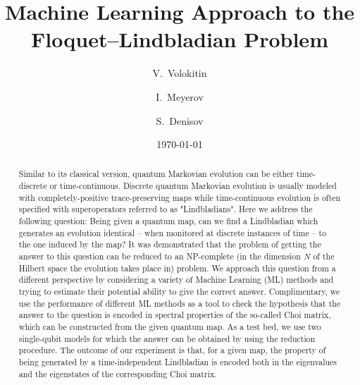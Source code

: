 \documentclass[%
 aip,
 floatfix,
 amsmath,amssymb,
 reprint,%
]{revtex4-1}
\begin{document}

\title{Machine Learning Approach to the Floquet--Lindbladian Problem
}

\author{V.~Volokitin}

\author{I.~Meyerov}

\author{S.~Denisov}


\date{\today}

\begin{abstract}
Similar to its classical version,
quantum Markovian evolution can be either time-discrete or time-continuous. %
Discrete quantum Markovian evolution is usually modeled with completely-positive trace-preserving maps while time-continuous evolution is often specified with superoperators referred to as "Lindbladians". Here we address the following question: Being given a quantum map, can we find a  Lindbladian which generates an evolution identical -- when monitored at discrete instances of time -- to the one induced by the map? It was demonstrated that the problem of getting the answer to this question can be reduced to an NP-complete (in the dimension $N$ of the Hilbert space  the evolution takes place in) problem. We approach this question  from a different perspective by considering a variety of Machine Learning (ML) methods and trying to estimate their potential ability to give the correct answer. Complimentary, we use the performance of different ML methods as a tool to check the hypothesis that the answer to the question is encoded in spectral properties of the so-called Choi matrix, which can be constructed from the given quantum map. As a test bed, we use two single-qubit models for which the answer can be obtained by using the reduction procedure. The outcome of our experiment is that, for a given map, the property of being generated by a time-independent Lindbladian is encoded both in the eigenvalues and the eigenstates of the corresponding  Choi matrix.
\end{abstract}
\end{document}
